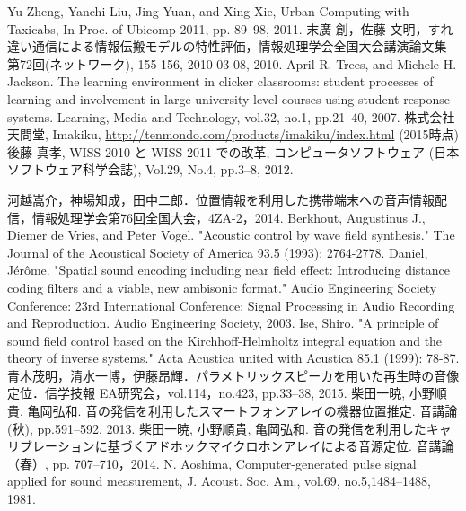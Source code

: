 \begin{thebibliography}{99}

       Yu Zheng, Yanchi Liu, Jing Yuan, and Xing Xie, Urban Computing with Taxicabs, In Proc. of Ubicomp 2011, pp. 89--98, 2011.
  末廣 創，佐藤 文明，すれ違い通信による情報伝搬モデルの特性評価，情報処理学会全国大会講演論文集 第72回(ネットワーク), 155-156, 2010-03-08, 2010.
     April R. Trees, and Michele H. Jackson. The learning environment in clicker classrooms: student processes of learning and involvement in large university‐level courses using student response systems. Learning, Media and Technology, vol.32, no.1, pp.21--40, 2007.
     株式会社天問堂, Imakiku, \url{http://tenmondo.com/products/imakiku/index.html} (2015時点)
     後藤 真孝, WISS 2010 と WISS 2011 での改革, コンピュータソフトウェア (日本ソフトウェア科学会誌), Vol.29, No.4, pp.3--8, 2012.

 河越嵩介，神場知成，田中二郎．位置情報を利用した携帯端末への音声情報配信，情報処理学会第76回全国大会，4ZA-2，2014.
       Berkhout, Augustinus J., Diemer de Vries, and Peter Vogel. "Acoustic control by wave field synthesis." The Journal of the Acoustical Society of America 93.5 (1993): 2764-2778.
       Daniel, Jérôme. "Spatial sound encoding including near field effect: Introducing distance coding filters and a viable, new ambisonic format." Audio Engineering Society Conference: 23rd International Conference: Signal Processing in Audio Recording and Reproduction. Audio Engineering Society, 2003.
       Ise, Shiro. "A principle of sound field control based on the Kirchhoff-Helmholtz integral equation and the theory of inverse systems." Acta Acustica united with Acustica 85.1 (1999): 78-87.
   青木茂明，清水一博，伊藤昂輝．パラメトリックスピーカを用いた再生時の音像定位．信学技報 EA研究会，vol.114，no.423, pp.33--38, 2015.
 柴田一暁, 小野順貴, 亀岡弘和. 音の発信を利用したスマートフォンアレイの機器位置推定. 音講論 (秋), pp.591--592, 2013.
 柴田一暁, 小野順貴, 亀岡弘和. 音の発信を利用したキャリブレーションに基づくアドホックマイクロホンアレイによる音源定位. 音講論 （春）, pp. 707--710，2014.
   N. Aoshima, Computer-generated pulse signal applied for sound measurement, J. Acoust. Soc. Am., vol.69, no.5,1484--1488, 1981.



\end{thebibliography}
